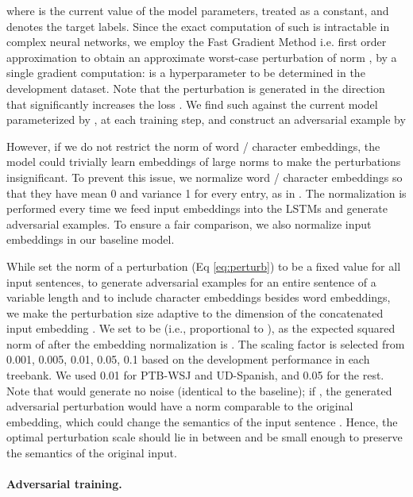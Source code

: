 \documentclass[11pt,a4paper]{article}
\begin{document}
where  is the current value of the model parameters, treated as a constant, and  denotes the target labels.
Since the exact computation of such  is intractable in complex neural networks, we employ the Fast Gradient Method \cite{liu2017delving,miyato2017adv} i.e. first order approximation to obtain an approximate worst-case perturbation of norm , by a single gradient computation:
 is a hyperparameter to be determined in the development dataset.
Note that the perturbation  is generated in the direction that significantly increases the loss .
We find such  against the current model parameterized by , at each training step, and construct an adversarial example by\vspace{-1mm}


However,
if we do not restrict the norm of word \!/\! character embeddings,
the model could trivially learn embeddings of large norms to make the perturbations insignificant.
To prevent this issue, we normalize word \!/\! character embeddings so that they have mean 0 and variance 1 for every entry, as in .
The normalization is performed  every time we feed input embeddings into the LSTMs and generate adversarial examples.
To ensure a fair comparison, we also normalize input embeddings in our baseline model.



While  set the norm of a perturbation  (Eq \ref{eq:perturb}) to be a fixed value for all input sentences,
to generate adversarial examples for an entire sentence of a variable length and to include character embeddings besides word embeddings, we make the perturbation size  adaptive to the dimension of the concatenated input embedding . 
We set  to be  (i.e., proportional to ), as the expected squared norm of  after the embedding normalization is .
The scaling factor  is selected from 0.001, 0.005, 0.01, 0.05, 0.1 
based on the development performance in each treebank. 
We used 0.01 for PTB-WSJ and UD-Spanish, and 0.05 for the rest.
Note that  
would generate no noise (identical to the baseline);
if , the generated adversarial perturbation would have a norm comparable to the original embedding, which could change the semantics of the input sentence \cite{Wu2017adv}.
Hence, the optimal perturbation scale  should lie in between and be small enough to preserve the semantics of the original input.


\paragraph{Adversarial training.}
\end{document}
